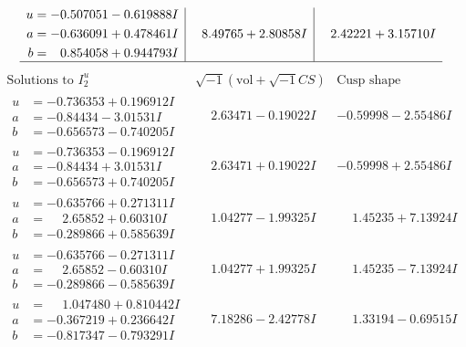 \documentclass[1p]{elsarticle_modified}
\theoremstyle{definition}
\newcommand{\I}{\sqrt{-1}}
\begin{document}
$$\begin{array}{c|c|c}
\begin{aligned}
u &= -0.507051 - 0.619888 I \\
a &= -0.636091 + 0.478461 I \\
b &= \phantom{-}0.854058 + 0.944793 I\end{aligned}
 & \phantom{-}8.49765 + 2.80858 I & \phantom{-}2.42221 + 3.15710 I\\
 \hline 
 \end{array}$$\newpage$$\begin{array}{c|c|c}  
\text{Solutions to }I^u_{2}& \I (\text{vol} + \sqrt{-1}CS) & \text{Cusp shape}\\
 \hline 
\begin{aligned}
u &= -0.736353 + 0.196912 I \\
a &= -0.84434 - 3.01531 I \\
b &= -0.656573 - 0.740205 I\end{aligned}
 & \phantom{-}2.63471 - 0.19022 I & -0.59998 - 2.55486 I \\ \hline\begin{aligned}
u &= -0.736353 - 0.196912 I \\
a &= -0.84434 + 3.01531 I \\
b &= -0.656573 + 0.740205 I\end{aligned}
 & \phantom{-}2.63471 + 0.19022 I & -0.59998 + 2.55486 I \\ \hline\begin{aligned}
u &= -0.635766 + 0.271311 I \\
a &= \phantom{-}2.65852 + 0.60310 I \\
b &= -0.289866 + 0.585639 I\end{aligned}
 & \phantom{-}1.04277 - 1.99325 I & \phantom{-}1.45235 + 7.13924 I \\ \hline\begin{aligned}
u &= -0.635766 - 0.271311 I \\
a &= \phantom{-}2.65852 - 0.60310 I \\
b &= -0.289866 - 0.585639 I\end{aligned}
 & \phantom{-}1.04277 + 1.99325 I & \phantom{-}1.45235 - 7.13924 I \\ \hline\begin{aligned}
u &= \phantom{-}1.047480 + 0.810442 I \\
a &= -0.367219 + 0.236642 I \\
b &= -0.817347 - 0.793291 I\end{aligned}
 & \phantom{-}7.18286 - 2.42778 I & \phantom{-}1.33194 - 0.69515 I \\ \hline\begin{aligned}

\end{aligned}
\end{array}$$
\end{document}
